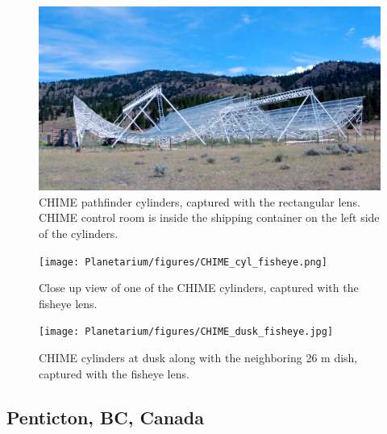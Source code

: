 \begin{figure}[htb]
\begin{center}
\includegraphics[width=0.95\linewidth]{Planetarium/figures/CHIME_cylinders.jpg}
\caption{CHIME pathfinder cylinders, captured with the rectangular lens. CHIME control room is inside the shipping container on the left side of the cylinders.}
\label{Fig:CHIME_cyl}
\end{center}
\end{figure}

\begin{figure}[htb]
\centering
\begin{minipage}[b]{0.51\textwidth}
\centering
\texttt{[image: Planetarium/figures/CHIME\_cyl\_fisheye.png]}
\caption{Close up view of one of the CHIME cylinders, captured with the fisheye lens.}
\label{Fig:CHIME_cyl_fisheye}
\end{minipage}%
\begin{minipage}[b]{0.02\textwidth}
\hspace{1cm}
\end{minipage}%
\begin{minipage}[b]{0.43\textwidth}
\centering
\texttt{[image: Planetarium/figures/CHIME\_dusk\_fisheye.jpg]}
\caption{CHIME cylinders at dusk along with the neighboring 26 m dish, captured with the fisheye lens.}
\label{Fig:CHIME_dusk_fisheye}
\end{minipage}
\end{figure}


\subsection{Penticton, BC, Canada}


